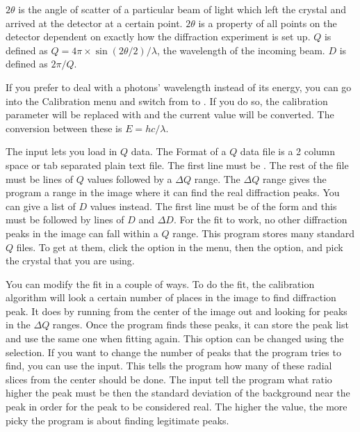 \index{$2\theta$}
$2\theta$ is the angle of scatter of a particular beam of light 
which left the crystal and arrived at the detector at a certain 
point. $2\theta$ is a property of all points on the detector 
dependent on exactly how the diffraction experiment is set up. 
$Q$ is defined as $Q=4\pi \times \sin(2\theta/2)/\lambda$, the 
wavelength of the incoming beam. $D$ is defined as $2\pi/Q$.

If you prefer to deal with a photons' wavelength instead of its 
energy, you can go into the Calibration menu and switch from
 to . If you do so, the
calibration parameter  will be replaced with
\gui{$\lambda$:} and the current value will be converted. 
The conversion between these is $E=hc/\lambda$.

The  input lets you load in $Q$ data. The Format
of a $Q$ data file is a 2 column space or tab separated plain
text file. The first line must be . The rest of
the file must be lines of $Q$ values followed by a $\Delta Q$
range. The $\Delta Q$ range gives the program a range in the
image where it can find the real diffraction peaks. You can
give a list of $D$ values instead. The first line must be of
the form  and this must be followed by lines of
$D$ and $\Delta D$. For the fit to work, no other diffraction
peaks in the image can fall within a $Q$ range. This program
stores many standard $Q$ files. To get at them, click the 
 option in the menu, then the 
option, and pick the crystal that you are using.

You can modify the fit in a couple of ways. To do the fit,
the calibration algorithm will look a certain number of 
places in the image to find diffraction peak. It does by
running from the center of the image out and looking for
peaks in the $\Delta Q$ ranges. Once the program finds
these peaks, it can store the peak list and use the same
one when fitting again. This option can be changed using
the  selection. If
you want to change the number of peaks that the program
tries to find, you can use the  input.
This tells the program how many of these radial slices from 
the center should be done. The  input tell the 
program what ratio higher the peak must be then the standard
deviation of the background near the peak in order for the
peak to be considered real. The higher the value, the more
picky the program is about finding legitimate peaks.

